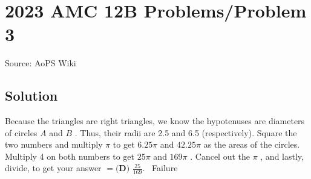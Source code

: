 \documentclass[12pt]{article}
\begin{document}
\section*{{2023 AMC 12B Problems/Problem 3}}
Source: AoPS Wiki

\subsection*{Solution}
Because the triangles are right triangles, we know the hypotenuses are diameters of circles $A$ and $B$ . Thus, their radii are 2.5 and 6.5 (respectively). Square the two numbers and multiply $\pi$ to get $6.25\pi$ and $42.25\pi$ as the areas of the circles. Multiply 4 on both numbers to get $25\pi$ and $169\pi$ . Cancel out the $\pi$ , and lastly, divide, to get your answer $=\boxed{\textbf{(D) }\frac{25}{169}}.$ ~Failure
\end{document}
